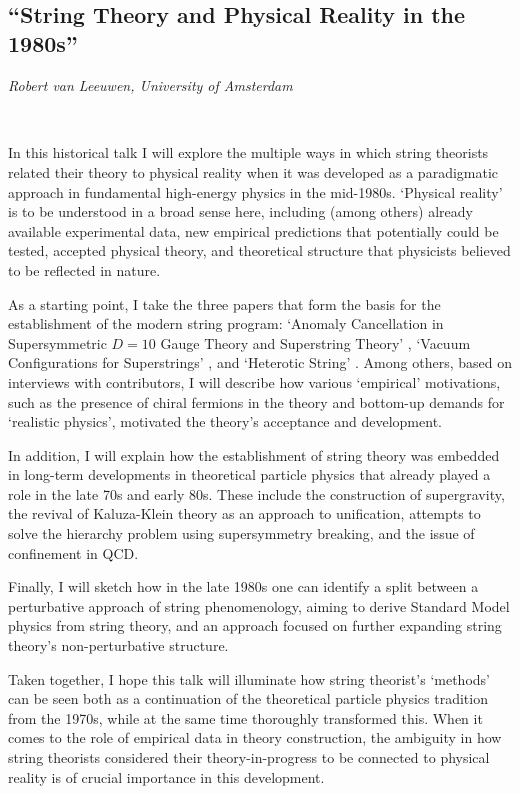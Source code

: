 \documentclass[11pt]{article}
\begin{document}
\ 

\newrefsection
\subsection*{\textsf{``String Theory and Physical
Reality in the 1980s''}}

\textcolor{moderncvgreen}{
\textit{Robert van Leeuwen, University of Amsterdam
}
}

\

In this historical talk I will explore the multiple ways in which string theorists related their theory to physical reality when it was developed as a paradigmatic approach in fundamental high-energy physics in the mid-1980s. ‘Physical reality’ is to be understood in a broad sense here, including (among others) already available experimental data, new empirical predictions that potentially could be tested, accepted physical theory, and theoretical structure that physicists believed to be reflected in nature.

As a starting point, I take the three papers that form the basis for the establishment of the modern string program: ‘Anomaly Cancellation in Supersymmetric \( D = 10 \) Gauge Theory and Superstring Theory’ \cite{green1984anomaly}, ‘Vacuum Configurations for Superstrings’ \cite{candelas1985vacuum}, and ‘Heterotic String’ \cite{gross1985heterotic}. Among others, based on interviews with contributors, I will describe how various ‘empirical’ motivations, such as the presence of chiral fermions in the theory and bottom-up demands for ‘realistic physics’, motivated the theory’s acceptance and development.

In addition, I will explain how the establishment of string theory was embedded in long-term developments in theoretical particle physics that already played a role in the late 70s and early 80s. These include the construction of supergravity, the revival of Kaluza-Klein theory as an approach to unification, attempts to solve the hierarchy problem using supersymmetry breaking, and the issue of confinement in QCD.

Finally, I will sketch how in the late 1980s one can identify a split between a perturbative approach of string phenomenology, aiming to derive Standard Model physics from string theory, and an approach focused on further expanding string theory’s non-perturbative structure.

Taken together, I hope this talk will illuminate how string theorist’s ‘methods’ can be seen both as a continuation of the theoretical particle physics tradition from the 1970s, while at the same time thoroughly transformed this. When it comes to the role of empirical data in theory construction, the ambiguity in how string theorists considered their theory-in-progress to be connected to physical reality is of crucial importance in this development.
\end{document}
